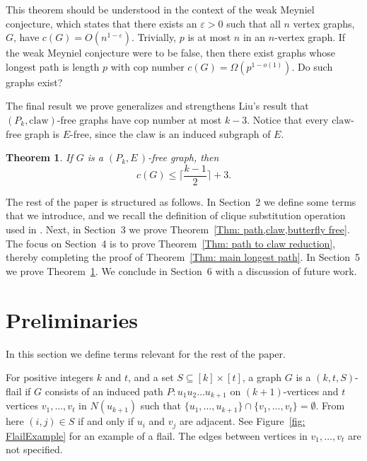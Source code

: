 \documentclass[12pt]{article}
\newtheorem{theorem}{Theorem}[section]
\theoremstyle{definition}
\def\epsilon{\varepsilon}
\def\claw{\text{claw}}
\def\E{\textit{E}}
\begin{document}
This theorem should be understood in the context of the 
weak Meyniel conjecture, 
which states that there exists an $\epsilon>0$ such that all $n$ vertex graphs,  $G$,
have $c(G) = O(n^{1-\epsilon})$.
Trivially, $p$ is at most $n$ in an $n$-vertex graph. If the weak Meyniel conjecture
were to be false, then there exist graphs whose longest path is length $p$ with cop number $c(G) = \Omega(p^{1-o(1)})$.
Do such graphs exist? 


 



The final result we prove 
generalizes and strengthens Liu's result that $(P_k,\claw)$-free graphs
have cop number at most $k-3$.
Notice that every $\claw$-free graph is $\E$-free, since the $\claw$ is an induced subgraph of $\E$.

\begin{theorem}\label{Thm: E free}
    If $G$ is a $(P_k,\E \,)$-free graph, then 
    \[
    c(G) \leq \Big\lceil \frac{k-1}{2}\Big\rceil+3.
    \] 
\end{theorem}



The rest of the paper is structured as follows.
In Section~2 we define some terms that we introduce, 
and we recall the definition of clique substitution operation used in \cite{joret2010cops}.
Next, in Section~3 we prove Theorem~\ref{Thm: path,claw,butterfly free}.
The focus on Section~4 is to prove Theorem~\ref{Thm: path to claw reduction}, 
thereby completing the proof of Theorem~\ref{Thm: main longest path}.
In Section~5 we prove Theorem~\ref{Thm: E free}.
We conclude in Section~6 with a discussion of future work.









\section{Preliminaries}

In this section we define terms relevant for the rest of the paper.

For positive integers $k$ and $t$, and a set $S \subseteq [k] \times [t]$,
a graph $G$ is a $(k,t,S)$-flail 
if $G$ consists of an induced path $P:u_1u_2\dots u_{k+1}$ on $(k+1)$-vertices 
and $t$ vertices $v_1,\dots, v_t$ in $N(u_{k+1})$
such that $\{u_1,\dots, u_{k+1}\} \cap \{v_1,\dots, v_t\} = \emptyset$.
From here $(i,j) \in S$ if and only if $u_i$ and $v_j$ are adjacent.
See Figure~\ref{fig: FlailExample} for an example of a flail.
The edges between vertices in $v_1,\ldots,v_t$ are not specified. 
\end{document}
